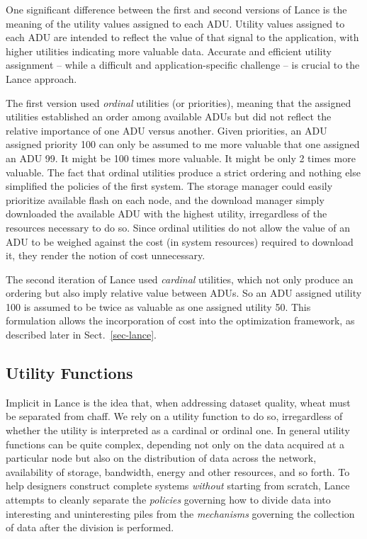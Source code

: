 One significant difference between the first and second versions of Lance is
the meaning of the utility values assigned to each ADU.  Utility values
assigned to each ADU are intended to reflect the value of that signal to the
application, with higher utilities indicating more valuable data.  Accurate
and efficient utility assignment -- while a difficult and
application-specific challenge -- is crucial to the Lance approach.

The first version used \textit{ordinal} utilities (or priorities), meaning
that the assigned utilities established an order among available ADUs but did
not reflect the relative importance of one ADU versus another. Given
priorities, an ADU assigned priority 100 can only be assumed to me more
valuable that one assigned an ADU 99. It might be 100 times more valuable. It
might be only 2 times more valuable.  The fact that ordinal utilities produce
a strict ordering and nothing else simplified the policies of the first
system. The storage manager could easily prioritize available flash on each
node, and the download manager simply downloaded the available ADU with the
highest utility, irregardless of the resources necessary to do so. Since
ordinal utilities do not allow the value of an ADU to be weighed against the
cost (in system resources) required to download it, they render the notion of
cost unnecessary.

The second iteration of Lance used \textit{cardinal} utilities, which not
only produce an ordering but also imply relative value between ADUs. So an
ADU assigned utility 100 is assumed to be twice as valuable as one assigned
utility 50. This formulation allows the incorporation of cost into the
optimization framework, as described later in Sect.~\ref{sec-lance}.

\subsection{Utility Functions}

Implicit in Lance is the idea that, when addressing dataset quality, wheat
must be separated from chaff. We rely on a utility function to do so,
irregardless of whether the utility is interpreted as a cardinal or ordinal
one.  In general utility functions can be quite complex, depending not only
on the data acquired at a particular node but also on the distribution of
data across the network, availability of storage, bandwidth, energy and other
resources, and so forth.  To help designers construct complete systems
\textit{without} starting from scratch, Lance attempts to cleanly separate
the \textit{policies} governing how to divide data into interesting and
uninteresting piles from the \textit{mechanisms} governing the collection of
data after the division is performed.

